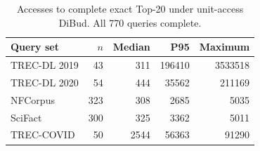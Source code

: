 \begin{table}[H]
\centering
\caption{Accesses to complete exact Top-20 under unit-access DiBud. All 770 queries complete.}
\label{tab:cost}
\small\setlength{\tabcolsep}{3pt}
\begin{tabular}{lrrrr}
\toprule
Query set & $n$ & Median & P95 & Maximum \\
\midrule
TREC-DL 2019 & 43 & 311 & 196410 & 3533518 \\
TREC-DL 2020 & 54 & 444 & 35562 & 211169 \\
NFCorpus & 323 & 308 & 2685 & 5035 \\
SciFact & 300 & 325 & 3362 & 5011 \\
TREC-COVID & 50 & 2544 & 56363 & 91290 \\
\bottomrule
\end{tabular}
\end{table}
